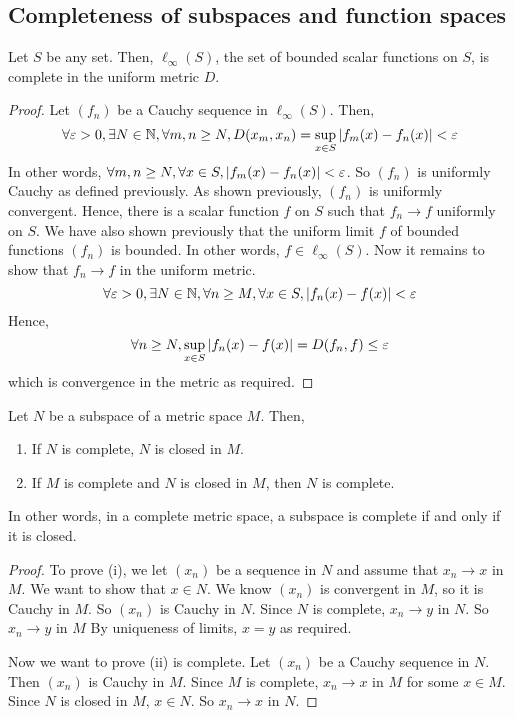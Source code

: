 \subsection{Completeness of subspaces and function spaces}
\begin{theorem}
	Let \( S \) be any set.
	Then, \( \ell_\infty(S) \), the set of bounded scalar functions on \( S \), is complete in the uniform metric \( D \).
\end{theorem}
\begin{proof}
	Let \( (f_n) \) be a Cauchy sequence in \( \ell_\infty(S) \).
	Then,
	\[
		\forall \varepsilon > 0, \exists N \in \mathbb N, \forall m,n \geq N, D(x_m, x_n) = \sup_{x \in S} \abs{f_m(x) - f_n(x)} < \varepsilon
	\]
	In other words, \( \forall m,n \geq N, \forall x \in S, \abs{f_m(x) - f_n(x)} < \varepsilon \).
	So \( (f_n) \) is uniformly Cauchy as defined previously.
	As shown previously, \( (f_n) \) is uniformly convergent.
	Hence, there is a scalar function \( f \) on \( S \) such that \( f_n \to f \) uniformly on \( S \).
	We have also shown previously that the uniform limit \( f \) of bounded functions \( (f_n) \) is bounded.
	In other words, \( f \in \ell_\infty(S) \).
	Now it remains to show that \( f_n \to f \) in the uniform metric.
	\[
		\forall \varepsilon > 0, \exists N \in \mathbb N, \forall n \geq M, \forall x \in S, \abs{f_n(x) - f(x)} < \varepsilon
	\]
	Hence,
	\[
		\forall n \geq N, \sup_{x \in S} \abs{f_n(x) - f(x)} = D(f_n,f) \leq \varepsilon
	\]
	which is convergence in the metric as required.
\end{proof}
\begin{proposition}
	Let \( N \) be a subspace of a metric space \( M \).
	Then,
	\begin{enumerate}
		\item If \( N \) is complete, \( N \) is closed in \( M \).
		\item If \( M \) is complete and \( N \) is closed in \( M \), then \( N \) is complete.
	\end{enumerate}
	In other words, in a complete metric space, a subspace is complete if and only if it is closed.
\end{proposition}
\begin{proof}
	To prove (i), we let \( (x_n) \) be a sequence in \( N \) and assume that \( x_n \to x \) in \( M \).
	We want to show that \( x \in N \).
	We know \( (x_n) \) is convergent in \( M \), so it is Cauchy in \( M \).
	So \( (x_n) \) is Cauchy in \( N \).
	Since \( N \) is complete, \( x_n \to y \) in \( N \).
	So \( x_n \to y \) in \( M \)
	By uniqueness of limits, \( x = y \) as required.

	Now we want to prove (ii) is complete.
	Let \( (x_n) \) be a Cauchy sequence in \( N \).
	Then \( (x_n) \) is Cauchy in \( M \).
	Since \( M \) is complete, \( x_n \to x \) in \( M \) for some \( x \in M \).
	Since \( N \) is closed in \( M \), \( x \in N \).
	So \( x_n \to x \) in \( N \).
\end{proof}
